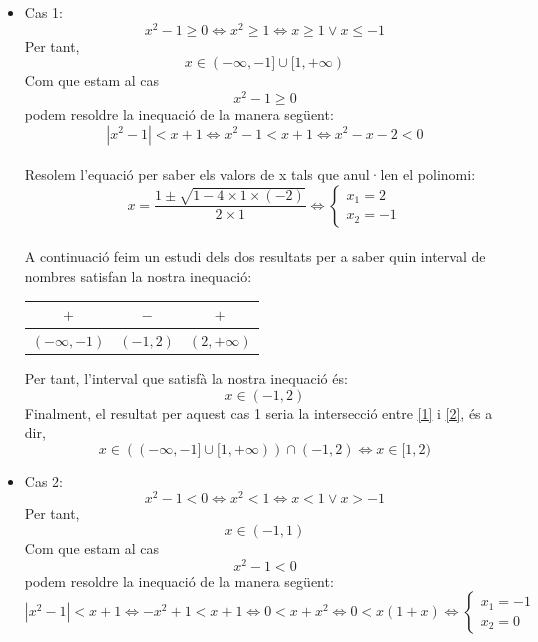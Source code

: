 \begin{itemize}
\item Cas 1: $$x^2-1\geq0 \Leftrightarrow x^2\geq1\Leftrightarrow x\geq1 \lor x\leq-1$$
Per tant, 
\begin{equation}\label{1}
x\in(-\infty,-1]\cup[1,+\infty)
\end{equation}
Com que estam al cas $$x^2-1\geq0$$ podem resoldre la inequació de la manera següent: $$|x^2-1| < x+1 \Leftrightarrow x^2-1 < x+1 \Leftrightarrow x^2-x-2<0
$$\\ Resolem l'equació per saber els valors de x tals que anul·len el polinomi:$$
x=\frac{1\pm\sqrt{1-4\times1\times(-2)}}{2\times1}\Leftrightarrow \left\lbrace\begin{array}{cc} x_1 = 2\\x_2=-1
\end{array}\right.$$\\
A continuació feim un estudi dels dos resultats per a saber quin interval de nombres satisfan la nostra inequació:\\
\begin{center}
\begin{tabular}{|c|c|c|}
\hline
$+$&$-$&$+$\\
\hline
$(-\infty,-1)$&$(-1,2)$&$(2,+\infty)$\\
\hline
\end{tabular}
\end{center}
Per tant, l'interval que satisfà la nostra inequació és:
\begin{equation}\label{2}
x\in(-1,2)
\end{equation}
Finalment, el resultat per aquest cas 1 seria la intersecció entre \ref{1} i \ref{2}, és a dir, 
\begin{equation}\label{3}
x\in((-\infty,-1]\cup[1,+\infty))\cap(-1,2) \Leftrightarrow x\in[1,2)
\end{equation}
\item Cas 2: $$x^2-1<0 \Leftrightarrow x^2<1 \Leftrightarrow x<1 \lor x>-1$$
Per tant, 
\begin{equation}\label{4}
x\in(-1,1)
\end{equation}
Com que estam al cas $$x^2-1<0$$ podem resoldre la inequació de la manera següent: $$|x^2-1| < x+1 \Leftrightarrow -x^2+1 < x+1 \Leftrightarrow 0<x+x^2\Leftrightarrow0<x(1+x)\Leftrightarrow \left\lbrace\begin{array}{cc} x_1 = -1\\x_2=0
\end{array}\right.$$\\

\end{itemize}
